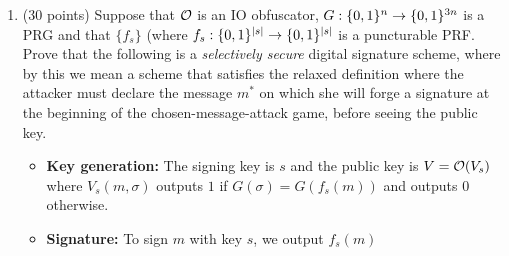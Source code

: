 \documentclass{article}
\begin{document}
\begin{enumerate}
\begin{enumerate}[,label=\alph*.]
\begin{mdbmarginx}{1ex}{0pt}{1ex}{0pt}%
\noindent{}\textbf{Proof}.  Note that by construction, $s^*$ reveals no information about $f(x^*)$ since 
$f(x^*) = G_{x_n}(G_{x_{n-1}}(\cdots G_{x_1}(s)))$, no part of which is revealed by $s^*$. Therefore,
by the security of PRFs, it must be the case that $f^(x^*) \approx U_n$. 
On input $z \in \zo^{2n}$%
\end{mdbmarginx}%

By the construction above, we can readily see that EVAL can compute for every $x \neq x^*$, $f_s(x)$
efficiently, since it perform at most $n - 1$ calls to $G$, which itself is efficient. Therefore,
we have constructed a puncturable PRF.%

\item{}
(30 points) Suppose that $\mathcal{O}$ is an IO obfuscator, $G:\{0,1\}^n\rightarrow\{0,1\}^{3n}$ is a PRG and that $\{ f_s \}$ (where $f_s:\{0,1\}^{|s|}\rightarrow\{0,1\}^{|s|}$ is a puncturable PRF. Prove that the following is a \emph{selectively secure} digital signature scheme, where by this we mean a scheme that satisfies the relaxed definition where the attacker must declare the message $m^*$ on which she will forge a signature at the beginning of the chosen-message-attack game, before seeing the public key.%

\begin{itemize}[noitemsep,topsep=\mdcompacttopsep]%

\item{}\textbf{Key generation:} The signing key is $s$ and the public key is $V=\mathcal{O}(V_s)$ where $V_s(m,\sigma)$ outputs $1$ if $G(\sigma)=G(f_s(m))$ and outputs $0$ otherwise.%

\item{}\textbf{Signature:} To sign  $m$ with key $s$, we output $f_s(m)$%


\end{itemize}
\end{enumerate}
\end{enumerate}
\end{document}
